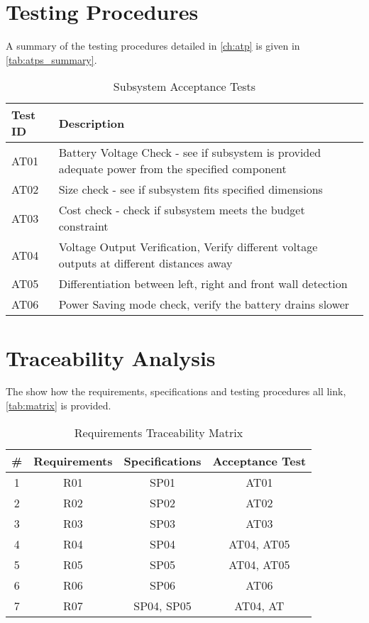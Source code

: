 \documentclass[class=report,11pt,crop=false]{standalone}
\begin{document}
\section{Testing Procedures}
A summary of the testing procedures detailed in \autoref{ch:atp} is given in \autoref{tab:atps_summary}.
\begin{table}[h]
\centering
\caption{Subsystem Acceptance Tests}
\label{tab:tests}
\begin{tabular}{ |>{\centering\arraybackslash}m{5cm}| m{10cm}|}
\hline
\textbf{Test ID} & \textbf{Description} \\
\hline
AT01 & Battery Voltage Check - see if subsystem is provided adequate power from the specified component \\
\hline
AT02 & Size check - see if subsystem fits specified dimensions \\
\hline
AT03 & Cost check - check if subsystem meets the budget constraint \\
\hline
AT04 & Voltage Output Verification, Verify different voltage outputs at different distances away\\
\hline
AT05 & Differentiation between left, right and front wall detection\\
\hline
AT06 & Power Saving mode check, verify the battery drains slower  \\
\hline
\end{tabular}
\end{table}

\section{Traceability Analysis}
The show how the requirements, specifications and testing procedures all link, \autoref{tab:matrix} is provided.

\begin{table}[h]
    \centering
    \caption{Requirements Traceability Matrix}
    \label{tab:matrix}
    \begin{tabular}{|c|c|c|c|}
        \hline
        \# & Requirements & Specifications  & Acceptance Test\\
        \hline
         1 & R01 &  SP01 & AT01 \\
         2 & R02 & SP02 & AT02 \\
         3 & R03 & SP03 & AT03 \\
         4 & R04 & SP04 & AT04, AT05 \\
         5 & R05 & SP05 & AT04, AT05 \\
         6 & R06 & SP06 & AT06 \\
         7 & R07 & SP04, SP05 & AT04, AT \\
    \hline
    \end{tabular}
\end{table}
\end{document}
